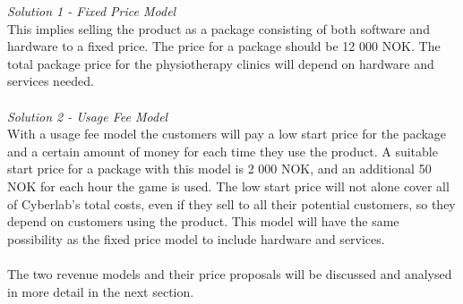 \emph{Solution 1 - Fixed Price Model}\\  
This implies selling the product as a package consisting of both software and hardware to a fixed price. The price for a package should be 12 000 NOK. The total package price for the physiotherapy clinics will depend on hardware and services needed. \\ \\
\emph{Solution 2 - Usage Fee Model}\\
With a usage fee model the customers will pay a low start price for the package and a certain amount of money for each time they use the product. A suitable start price for a package with this model is 2 000 NOK, and an additional 50 NOK for each hour the game is used. The low start price will not alone cover all of Cyberlab's total costs, even if they sell to all their potential customers, so they depend on customers using the product. This model will have the same possibility as the fixed price model to include hardware and services. \\ \\
The two revenue models and their price proposals will be discussed and analysed in more detail in the next section.

